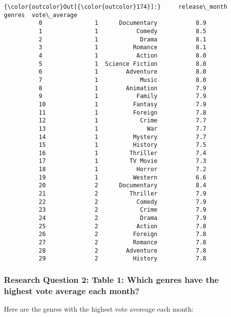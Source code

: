 \documentclass[11pt]{article}
\begin{document}
\begin{Verbatim}[commandchars=\\\{\}]
{\color{outcolor}Out[{\color{outcolor}174}]:}     release\_month           genres  vote\_average
          0               1      Documentary           8.9
          1               1           Comedy           8.5
          2               1            Drama           8.1
          3               1          Romance           8.1
          4               1           Action           8.0
          5               1  Science Fiction           8.0
          6               1        Adventure           8.0
          7               1            Music           8.0
          8               1        Animation           7.9
          9               1           Family           7.9
          10              1          Fantasy           7.9
          11              1          Foreign           7.8
          12              1            Crime           7.7
          13              1              War           7.7
          14              1          Mystery           7.7
          15              1          History           7.5
          16              1         Thriller           7.4
          17              1         TV Movie           7.3
          18              1           Horror           7.2
          19              1          Western           6.6
          20              2      Documentary           8.4
          21              2         Thriller           7.9
          22              2           Comedy           7.9
          23              2            Crime           7.9
          24              2            Drama           7.9
          25              2           Action           7.8
          26              2          Foreign           7.8
          27              2          Romance           7.8
          28              2        Adventure           7.8
          29              2          History           7.8
\end{Verbatim}
            
    \hypertarget{research-question-2-table-1-which-genres-have-the-highest-vote-average-each-month}{%
\subsubsection{Research Question 2: Table 1: Which genres have the
highest vote average each
month?}\label{research-question-2-table-1-which-genres-have-the-highest-vote-average-each-month}}

Here are the genres with the highest vote avereage each month:
\end{document}
